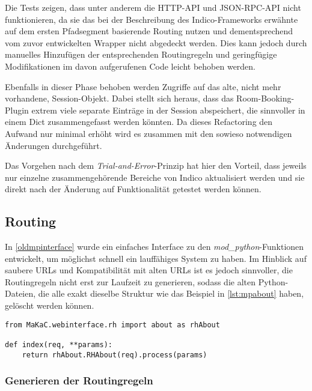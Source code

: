 Die Tests zeigen, dass unter anderem die HTTP-API und JSON-RPC-API nicht funktionieren, da sie das
bei der Beschreibung des Indico-Frameworks erwähnte auf dem ersten Pfadsegment basierende Routing
nutzen und dementsprechend vom zuvor entwickelten Wrapper nicht abgedeckt werden. Dies kann jedoch
durch manuelles Hinzufügen der entsprechenden Routingregeln und geringfügige Modifikationen im davon
aufgerufenen Code leicht behoben werden.

Ebenfalls in dieser Phase behoben werden Zugriffe auf das alte, nicht mehr vorhandene,
Session-Objekt. Dabei stellt sich heraus, dass das Room-Booking-Plugin extrem viele separate
Einträge in der Session abspeichert, die sinnvoller in einem Dict zusammengefasst werden könnten. Da
dieses Refactoring den Aufwand nur minimal erhöht wird es zusammen mit den sowieso notwendigen
Änderungen durchgeführt.

Das Vorgehen nach dem \emph{Trial-and-Error}-Prinzip hat hier den Vorteil, dass jeweils nur einzelne
zusammengehörende Bereiche von Indico aktualisiert werden und sie direkt nach der Änderung auf
Funktionalität getestet werden können.


\subsection{Routing}

In \autoref{oldmpinterface} wurde ein einfaches Interface zu den \emph{mod\_python}-Funktionen
entwickelt, um möglichst schnell ein lauffähiges System zu haben. Im Hinblick auf saubere URLs und
Kompatibilität mit alten URLs ist es jedoch sinnvoller, die Routingregeln nicht erst zur Laufzeit zu
generieren, sodass die alten Python-Dateien, die alle exakt dieselbe Struktur wie das Beispiel in
\autoref{lst:mpabout} haben, gelöscht werden können.

\begin{lstlisting}[caption=about.py im htdocs-Verzeichnis,label=lst:mpabout]
from MaKaC.webinterface.rh import about as rhAbout

def index(req, **params):
    return rhAbout.RHAbout(req).process(params)
\end{lstlisting}


\subsubsection{Generieren der Routingregeln}\label{routingrulegen}

